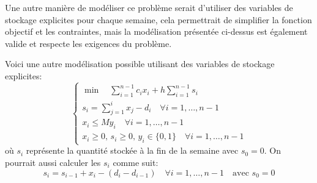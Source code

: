 {\begin{td-sol}[]
		Une autre manière de modéliser ce problème serait d'utiliser des variables de stockage explicites pour chaque semaine, cela permettrait de simplifier la fonction objectif et les contraintes, mais la modélisation présentée ci-dessus est également valide et respecte les exigences du problème.

		Voici une autre modélisation possible utilisant des variables de stockage explicites:
		\begin{equation*}
			\begin{cases}
				\min \quad \sum_{i=1}^{n-1} c_i x_i + h \sum_{i=1}^{n-1} s_i \\
				s_i = \sum_{j=1}^i x_j - d_i \quad \forall i = 1, \ldots, n-1 \\
				x_i \leq M y_i \quad \forall i = 1, \ldots, n-1 \\
				x_i \geq 0,\, s_i \geq 0,\, y_i \in \{0,1\} \quad \forall i = 1, \ldots, n-1
			\end{cases}
		\end{equation*}
		où \(s_i\) représente la quantité stockée à la fin de la semaine avec \(s_0 = 0\).
		On pourrait aussi calculer les \(s_i\) comme suit:
		\begin{equation*}
			s_i = s_{i-1} + x_i - (d_i - d_{i-1}) \quad \forall i = 1, \ldots, n-1
			\quad \text{avec } s_0 = 0
		\end{equation*}
	\end{td-sol}
}{}
